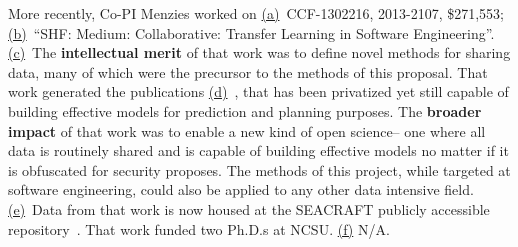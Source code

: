 More recently, Co-PI Menzies worked on \underline{(a)}~CCF-1302216, 2013-2107, \$271,553;   \underline{(b)}~``SHF: Medium: Collaborative: Transfer Learning in Software Engineering''. 
 \underline{(c)}~The {\bf intellectual merit} of that work was to
define novel methods for sharing data, many of which were the precursor to the methods of this proposal.  That work generated the publications  \underline{(d)}~\cite{krishna2018bellwethers,PetersML15,krishna16,he13,Me17,fu2016tuning,krishna2017learning}, that has been privatized yet still  capable of building effective models
for prediction and planning purposes.
The {\bf broader impact} of that work was to
enable a new kind of open science-- one where all data is routinely shared and is capable of building effective models no matter if it is obfuscated for security proposes.
The methods of this project, while targeted at software engineering, could also be applied to any other data intensive field.   
 \underline{(e)}~Data from that work is now housed at the SEACRAFT publicly accessible repository~\cite{seacraft}. That work  funded two Ph.D.s at NCSU. \underline{(f)}
N/A.  

